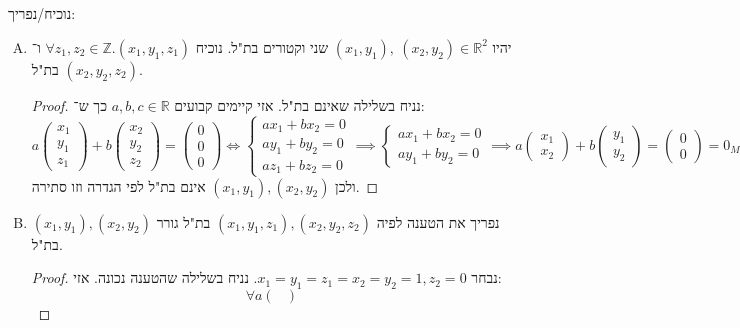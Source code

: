 \documentclass[]{article}
\newcommand\Z     {\mathbb{Z}}
\newcommand\R     {\mathbb{R}}
\begin{document}
	\section{}
	נוכיח/נפריך: 
	\begin{enumerate}[A)]
		\item יהיו $(x_1, y_1), \ (x_2, y_2) \in \R^2$ שני וקטורים בת"ל. נוכיח $\forall z_1, z_2 \in \Z. (x_1, y_1, z_1)$ ו־$(x_2, y_2, z_2)$ בת"ל. \begin{proof}
			נניח בשלילה שאינם בת"ל. אזי קיימים קבועים $a, b, c \in \R$ כך ש־: 
			\[ a\begin{pmatrix}
				x_1 \\ y_1 \\ z_1
			\end{pmatrix} + b\begin{pmatrix}
				x_2 \\ y_2 \\ z_2
			\end{pmatrix} = \begin{pmatrix}
				0 \\ 0 \\ 0
			\end{pmatrix} \iff \begin{cases}
				ax_1 + bx_2 = 0 \\
				ay_1 + by_2 = 0 \\
				az_1 + bz_2 = 0
			\end{cases} \implies \begin{cases}
			ax_1 + bx_2 = 0 \\
			ay_1 + by_2 = 0
			\end{cases} \implies a\begin{pmatrix}
				x_1 \\ x_2
			\end{pmatrix} + b\begin{pmatrix}
				y_1 \\ y_2
			\end{pmatrix} = \begin{pmatrix}
				0 \\ 0
			\end{pmatrix} = 0_{M_2(\R)} \]
			ולכן $(x_1, y_1), (x_2, y_2)$ אינם בת"ל לפי הגדרה וזו סתירה. 
		\end{proof}
		\item נפריך את הטענה לפיה $(x_1, y_1, z_1), (x_2, y_2, z_2)$ בת"ל גורר $(x_1, y_1), (x_2, y_2)$ בת"ל. \begin{proof}
			נבחר $x_1 = y_1 = z_1 = x_2 = y_2 = 1, z_2 = 0$. נניח בשלילה שהטענה נכונה. אזי: 
			\[ \forall a \begin{pmatrix}

\end{pmatrix}\]
\end{proof}
\end{enumerate}
\end{document}
